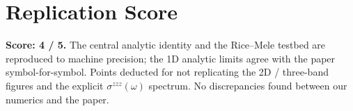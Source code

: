 \documentclass[11pt]{article}
\begin{document}
\section*{Replication Score}

\textbf{Score: 4 / 5.} The central analytic identity and the
Rice--Mele testbed are reproduced to machine precision; the 1D
analytic limits agree with the paper symbol-for-symbol. Points
deducted for not replicating the 2D / three-band figures and the
explicit $\sigma^{zzz}(\omega)$ spectrum. No discrepancies found
between our numerics and the paper.
\end{document}
